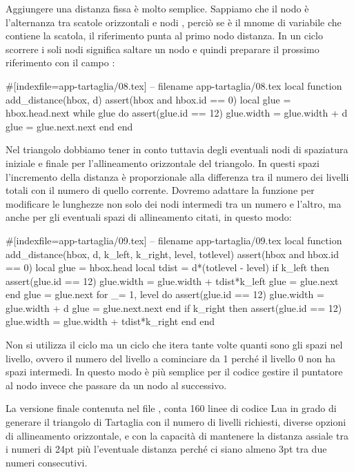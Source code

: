 Aggiungere una distanza fissa è molto semplice. Sappiamo che il nodo 
è l'alternanza tra scatole orizzontali e nodi , perciò se 
è il mnome di variabile che contiene la scatola, il riferimento
 punta al primo nodo distanza. In un ciclo 
scorrere i soli nodi  significa saltare un nodo e quindi preparare il
prossimo riferimento con il campo :
\begin{lines}
#[indexfile=app-tartaglia/08.tex]
-- filename app-tartaglia/08.tex
local function add_distance(hbox, d)
    assert(hbox and hbox.id == 0)
    local glue = hbox.head.next
    while glue do
        assert(glue.id == 12)
        glue.width = glue.width + d
        glue = glue.next.next
    end
end
\end{lines}

Nel triangolo dobbiamo tener in conto tuttavia degli eventuali nodi di
spaziatura iniziale e finale per l'allineamento orizzontale del triangolo. In
questi spazi l'incremento della distanza è proporzionale alla differenza tra il
numero dei livelli totali con il numero di quello corrente. Dovremo adattare la
funzione  per modificare le lunghezze non solo dei nodi
intermedi tra un numero e l'altro, ma anche per gli eventuali spazi di
allineamento citati, in questo modo:
\begin{lines}
#[indexfile=app-tartaglia/09.tex]
-- filename app-tartaglia/09.tex
local
function add_distance(hbox, d, k_left, k_right, level, totlevel)
    assert(hbox and hbox.id == 0)
    local glue = hbox.head
    local tdist = d*(totlevel - level)
    if k_left then
        assert(glue.id == 12)
        glue.width = glue.width + tdist*k_left
        glue = glue.next
    end
    glue = glue.next
    for _= 1, level do
        assert(glue.id == 12)
        glue.width = glue.width + d
        glue = glue.next.next
    end
    if k_right then
        assert(glue.id == 12)
        glue.width = glue.width +  tdist*k_right
    end
end
\end{lines}

Non si utilizza il ciclo  ma un ciclo  che itera tante
volte quanti sono gli spazi nel livello, ovvero il numero del livello a
cominciare da 1 perché il livello 0 non ha spazi intermedi. In questo modo è più
semplice per il codice gestire il puntatore al nodo invece che passare da un
nodo al successivo.

La versione finale contenuta nel file , conta 160
linee di codice Lua in grado di generare il triangolo di Tartaglia con il numero
di livelli richiesti, diverse opzioni di allineamento orizzontale, e con la
capacità di mantenere la distanza assiale tra i numeri di 24pt più l'eventuale
distanza perché ci siano almeno 3pt tra due numeri consecutivi.


